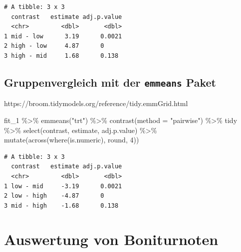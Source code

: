 \documentclass[
  letterpaper,
  DIV=11,
  oneside]{scrreport}
\newenvironment{Shaded}{\begin{snugshade}}{\end{snugshade}}
\newcommand{\AttributeTok}[1]{\textcolor[rgb]{0.40,0.45,0.13}{#1}}
\newcommand{\DecValTok}[1]{\textcolor[rgb]{0.68,0.00,0.00}{#1}}
\newcommand{\FunctionTok}[1]{\textcolor[rgb]{0.28,0.35,0.67}{#1}}
\newcommand{\NormalTok}[1]{\textcolor[rgb]{0.00,0.23,0.31}{#1}}
\newcommand{\SpecialCharTok}[1]{\textcolor[rgb]{0.37,0.37,0.37}{#1}}
\newcommand{\StringTok}[1]{\textcolor[rgb]{0.13,0.47,0.30}{#1}}
\begin{document}
\begin{verbatim}
# A tibble: 3 x 3
  contrast   estimate adj.p.value
  <chr>         <dbl>       <dbl>
1 mid - low      3.19      0.0021
2 high - low     4.87      0     
3 high - mid     1.68      0.138 
\end{verbatim}

\hypertarget{gruppenvergleich-mit-der-emmeans-paket}{%
\subsection{\texorpdfstring{Gruppenvergleich mit der \texttt{emmeans}
Paket}{Gruppenvergleich mit der emmeans Paket}}\label{gruppenvergleich-mit-der-emmeans-paket}}

https://broom.tidymodels.org/reference/tidy.emmGrid.html

\begin{Shaded}
\begin{Highlighting}[]
\NormalTok{fit\_1 }\SpecialCharTok{\%\textgreater{}\%} 
  \FunctionTok{emmeans}\NormalTok{(}\StringTok{"trt"}\NormalTok{) }\SpecialCharTok{\%\textgreater{}\%} 
  \FunctionTok{contrast}\NormalTok{(}\AttributeTok{method =} \StringTok{"pairwise"}\NormalTok{) }\SpecialCharTok{\%\textgreater{}\%} 
\NormalTok{  tidy }\SpecialCharTok{\%\textgreater{}\%} 
  \FunctionTok{select}\NormalTok{(contrast, estimate, adj.p.value) }\SpecialCharTok{\%\textgreater{}\%} 
  \FunctionTok{mutate}\NormalTok{(}\FunctionTok{across}\NormalTok{(}\FunctionTok{where}\NormalTok{(is.numeric), round, }\DecValTok{4}\NormalTok{))}
\end{Highlighting}
\end{Shaded}

\begin{verbatim}
# A tibble: 3 x 3
  contrast   estimate adj.p.value
  <chr>         <dbl>       <dbl>
1 low - mid     -3.19      0.0021
2 low - high    -4.87      0     
3 mid - high    -1.68      0.138 
\end{verbatim}

\hypertarget{auswertung-von-boniturnoten}{%
\section{Auswertung von
Boniturnoten}\label{auswertung-von-boniturnoten}}
\end{document}
